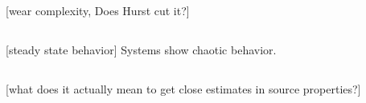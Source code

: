 \documentclass[preprint,1p, 10pt,authoryear]{elsarticle}
\begin{document}
\subsection{}
[wear complexity, Does Hurst cut it?]

\subsection{}
[steady state behavior]
Systems show chaotic behavior.  

\subsection{}
[what does it actually mean to get close estimates in source properties?]
\end{document}
